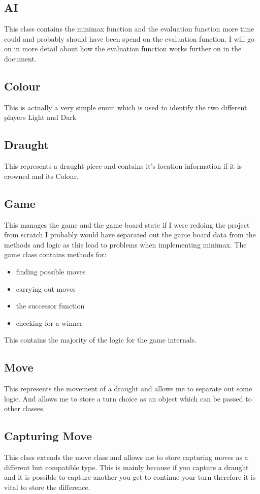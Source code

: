 \documentclass[a4paper,12pt]{scrartcl}
\begin{document}
{		\subsection{AI}{This class contains the minimax function and the evaluation function more time could and probably should have been spend on the evaluation function. I will go on in more detail about how the evaluation function works further on in the document.}
		\subsection{Colour}{This is actually a very simple enum which is used to identify the two different players Light and Dark}
		\subsection{Draught}{This represents a draught piece and contains it's location information if it is crowned and its Colour.}
		\subsection{Game}{This manages the game and the game board state if I were redoing the project from scratch I probably would have separated out the game board data from the methods and logic as this lead to problems when implementing minimax. The game class contains methods for:
			\begin{itemize}
				\item {finding possible moves}
				\item {carrying out moves}
				\item {the successor function}
				\item {checking for a winner}
			\end{itemize}	
			This contains the majority of the logic for the game internals.
		}
		\subsection{Move}{This represents the movement of a draught and allows me to separate out some logic. And allows me to store a turn choice as an object which can be passed to other classes.}
		\subsection{Capturing Move}{This class extends the move class and allows me to store capturing moves as a different but compatible type. This is mainly because if you capture a draught and it is possible to capture another you get to continue your turn therefore it is vital to store the difference.}		
	}
\end{document}
